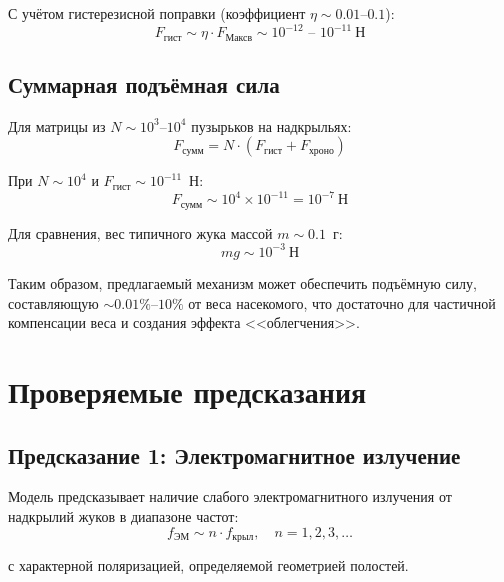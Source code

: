 \documentclass[12pt,a4paper]{article}
\begin{document}
С учётом гистерезисной поправки (коэффициент $\eta \sim 0.01$--$0.1$):
\begin{equation}
    F_{\text{гист}} \sim \eta \cdot F_{\text{Максв}} \sim 10^{-12} \text{ -- } 10^{-11}~\text{Н}
    \label{eq:hysteresis_force}
\end{equation}

\subsection{Суммарная подъёмная сила}

Для матрицы из $N \sim 10^3$--$10^4$ пузырьков на надкрыльях:
\begin{equation}
    F_{\text{сумм}} = N \cdot (F_{\text{гист}} + F_{\text{хроно}})
    \label{eq:total_force}
\end{equation}

При $N \sim 10^4$ и $F_{\text{гист}} \sim 10^{-11}$~Н:
\begin{equation}
    F_{\text{сумм}} \sim 10^4 \times 10^{-11} = 10^{-7}~\text{Н}
    \label{eq:total_estimate}
\end{equation}

Для сравнения, вес типичного жука массой $m \sim 0.1$~г:
\begin{equation}
    mg \sim 10^{-3}~\text{Н}
    \label{eq:weight}
\end{equation}

Таким образом, предлагаемый механизм может обеспечить подъёмную силу, составляющую $\sim 0.01\%$--$10\%$ от веса насекомого, что достаточно для частичной компенсации веса и создания эффекта <<облегчения>>.

\section{Проверяемые предсказания}

\subsection{Предсказание 1: Электромагнитное излучение}

Модель предсказывает наличие слабого электромагнитного излучения от надкрылий жуков в диапазоне частот:
\begin{equation}
    f_{\text{ЭМ}} \sim n \cdot f_{\text{крыл}}, \quad n = 1, 2, 3, \ldots
\end{equation}

с характерной поляризацией, определяемой геометрией полостей.
\end{document}
